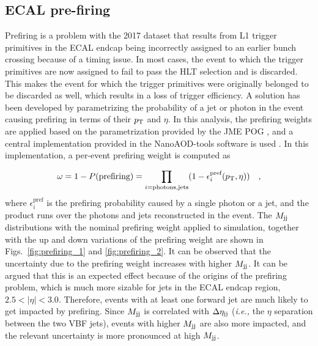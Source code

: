 \clearpage

\subsection{ECAL pre-firing}
\label{subsec:prefiring_weighting}

Prefiring is a problem with the 2017 dataset that results from L1 trigger primitives
in the ECAL endcap being incorrectly assigned to an earlier bunch crossing because
of a timing issue. In most cases, the event to which the trigger primitives are now assigned to
fail to pass the HLT selection and is discarded. This makes the event for which the trigger
primitives were originally belonged to be discarded as well, which results in a loss of trigger
efficiency. A solution has been developed by parametrizing
the probability of a jet or photon in the event causing prefiring in terms of their
$p_{\textrm{T}}$ and $\eta$. In this analysis, the prefiring weights are applied based on the parametrization
provided by the JME POG \cite{CMS:PrefiringTwiki}, and a central implementation provided in the
NanoAOD-tools software is used \cite{CMS:PrefiringNanoAODTools}. In this implementation, a per-event
prefiring weight is computed as

\begin{equation}
    \omega = 1 - P(\textrm{prefiring}) = \prod_{i=\textrm{photons,jets}} (1 - \epsilon_{i}^{\textrm{pref}}(p_{\textrm{T}}, \eta)) \quad ,
\end{equation}
where $\epsilon_{i}^{\textrm{pref}}$ is the prefiring probability caused by a single photon or a jet, and the product
runs over the photons and jets reconstructed in the event.
The $M_{\textrm{jj}}$ distributions with the nominal prefiring weight applied to simulation, together with the
up and down variations of the prefiring weight are shown in Figs.~\ref{fig:prefiring_1} and \ref{fig:prefiring_2}.
It can be observed that the uncertainty due to the prefiring weight increases with higher $M_{\textrm{jj}}$. It can be argued
that this is an expected effect because of the origins of the prefiring problem, which is much more sizable for jets
in the ECAL endcap region, $2.5 < |\eta| < 3.0$. Therefore, events with at least one forward jet are much likely to
get impacted by prefiring. Since $M_{\textrm{jj}}$ is correlated with $\Delta \eta_{\textrm{jj}}$ (\textit{i.e.,} the $\eta$ separation between the two
VBF jets), events with higher $M_{\textrm{jj}}$ are also more impacted, and the relevant uncertainty is more pronounced
at high $M_{\textrm{jj}}$. 

